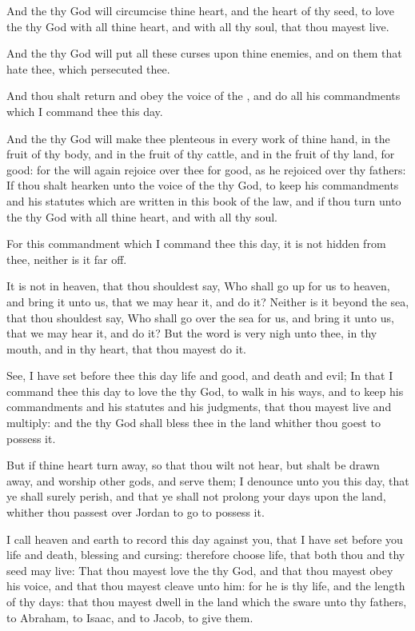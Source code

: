 \verse And the \LORD thy God will circumcise thine heart, and the heart of thy seed, to love the \LORD thy God with all thine heart, and with all thy soul, that thou mayest live.

\verse And the \LORD thy God will put all these curses upon thine enemies, and on them that hate thee, which persecuted thee.

\verse And thou shalt return and obey the voice of the \LORD, and do all his commandments which I command thee this day.

\verse And the \LORD thy God will make thee plenteous in every work of thine hand, in the fruit of thy body, and in the fruit of thy cattle, and in the fruit of thy land, for good: for the \LORD will again rejoice over thee for good, as he rejoiced over thy fathers: \verse If thou shalt hearken unto the voice of the \LORD thy God, to keep his commandments and his statutes which are written in this book of the law, and if thou turn unto the \LORD thy God with all thine heart, and with all thy soul.

\verse For this commandment which I command thee this day, it is not hidden from thee, neither is it far off.

\verse It is not in heaven, that thou shouldest say, Who shall go up for us to heaven, and bring it unto us, that we may hear it, and do it?  \verse Neither is it beyond the sea, that thou shouldest say, Who shall go over the sea for us, and bring it unto us, that we may hear it, and do it?  \verse But the word is very nigh unto thee, in thy mouth, and in thy heart, that thou mayest do it.

\verse See, I have set before thee this day life and good, and death and evil; \verse In that I command thee this day to love the \LORD thy God, to walk in his ways, and to keep his commandments and his statutes and his judgments, that thou mayest live and multiply: and the \LORD thy God shall bless thee in the land whither thou goest to possess it.

\verse But if thine heart turn away, so that thou wilt not hear, but shalt be drawn away, and worship other gods, and serve them; \verse I denounce unto you this day, that ye shall surely perish, and that ye shall not prolong your days upon the land, whither thou passest over Jordan to go to possess it.

\verse I call heaven and earth to record this day against you, that I have set before you life and death, blessing and cursing: therefore choose life, that both thou and thy seed may live: \verse That thou mayest love the \LORD thy God, and that thou mayest obey his voice, and that thou mayest cleave unto him: for he is thy life, and the length of thy days: that thou mayest dwell in the land which the \LORD sware unto thy fathers, to Abraham, to Isaac, and to Jacob, to give them.


